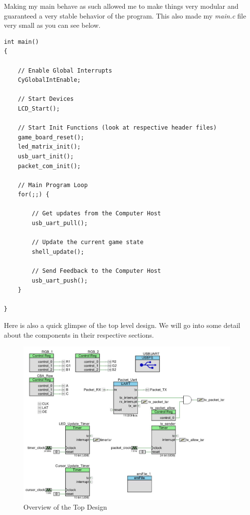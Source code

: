 \documentclass[a4paper, 12pt]{article}
\begin{document}
    Making my main behave as such allowed me to make things very modular and
    guaranteed a very stable behavior of the program. This also made my
    \textit{main.c} file very small as you can see below.

    \begin{verbatim}
int main()
{
    
    // Enable Global Interrupts
    CyGlobalIntEnable;
    
    // Start Devices
    LCD_Start();
    
    // Start Init Functions (look at respective header files)
    game_board_reset();
    led_matrix_init();
    usb_uart_init();
    packet_com_init();
    
    // Main Program Loop
    for(;;) {
        
        // Get updates from the Computer Host
        usb_uart_pull();
        
        // Update the current game state
        shell_update();
        
        // Send Feedback to the Computer Host
        usb_uart_push();
    }
    
}

    \end{verbatim}

    Here is also a quick glimpse of the top level design. We will go into
    some detail about the components in their respective sections.

    \begin{figure}[H]
        \centering
        \includegraphics[scale=0.4]{pics/toplevel}
        \caption{Overview of the Top Design}
        \label{fig:TopDesign}
    \end{figure}
\end{document}
